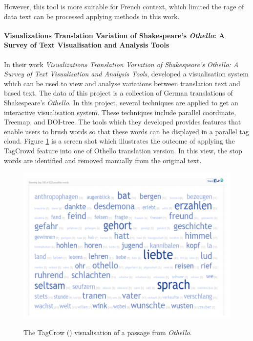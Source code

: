 However, this tool is more suitable for French context, which limited the rage of data text can be processed applying methods in this work.

\paragraph{Visualizations Translation Variation of Shakespeare's \emph{Othello}: A Survey of Text Visualisation and Analysis Tools}
\paragraph[]{} In their work \emph{Visualizations Translation Variation of Shakespeare's \emph{Othello}: A Survey of Text Visualisation and Analysis Tools}, \cite{Geng2011} developed a visualisation system which can be used to view and analyse variations between translation text and based text. The data of this project is a collection of German translations of Shakespeare’s \emph{Othello}. In this project, several techniques are applied to get an interactive visualisation system. These techniques include parallel coordinate, Treemap, and DOI-tree. The tools which they developed provides features that enable users to brush words so that these words can be displayed in a parallel tag cloud. Figure \ref{fig:tagCloud} is a screen shot which illustrates the outcome of applying the TagCrowd feature into one of Othello translation version. In this view, the stop words are identified and removed manually from the original text.

\begin{figure}[H]
	\centering    
	\includegraphics[scale=1]{Figs/Tagcloud}\\[1ex]
	\caption{The TagCrow (\cite{TagCrowd}) visualisation of a passage from \emph{Othello}.}
	\label{fig:tagCloud}
\end{figure} 

